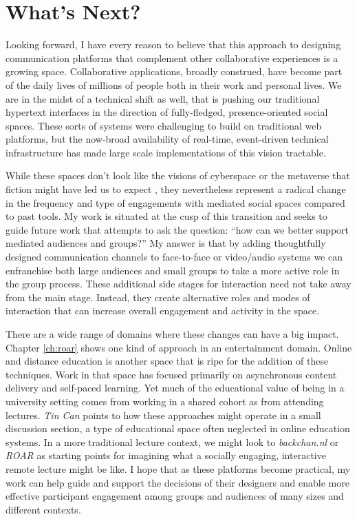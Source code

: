 

\section{What's Next?}
Looking forward, I have every reason to believe that this approach to designing communication platforms that complement other collaborative experiences is a growing space. Collaborative applications, broadly construed, have become part of the daily lives of millions of people both in their work and personal lives. We are in the midst of a technical shift as well, that is pushing our traditional hypertext interfaces in the direction of fully-fledged, presence-oriented social spaces. These sorts of systems were challenging to build on traditional web platforms, but the now-broad availability of real-time, event-driven technical infrastructure has made large scale implementations of this vision tractable.

While these spaces don't look like the visions of cyberspace or the metaverse that fiction might have led us to expect \citep{Stephenson:2000tv,Gibson:1986un,Vinge:2007wt}, they nevertheless represent a radical change in the frequency and type of engagements with mediated social spaces compared to past tools. My work is situated at the cusp of this transition and seeks to guide future work that attempts to ask the question: ``how can we better support mediated audiences and groups?'' My answer is that by adding thoughtfully designed communication channels to face-to-face or video/audio systems we can enfranchise both large audiences and small groups to take a more active role in the group process. These additional side stages for interaction need not take away from the main stage. Instead, they create alternative roles and modes of interaction that can increase overall engagement and activity in the space.

There are a wide range of domains where these changes can have a big impact. Chapter \ref{ch:roar} shows one kind of approach in an entertainment domain. Online and distance education is another space that is ripe for the addition of these techniques. Work in that space has focused primarily on asynchronous content delivery and self-paced learning. Yet much of the educational value of being in a university setting comes from working in a shared cohort as from attending lectures. \emph{Tin Can} points to how these approaches might operate in a small discussion section, a type of educational space often neglected in online education systems. In a more traditional lecture context, we might look to \emph{backchan.nl} or \emph{ROAR} as starting points for imagining what a socially engaging, interactive remote lecture might be like. I hope that as these platforms become practical, my work can help guide and support the decisions of their designers and enable more effective participant engagement among groups and audiences of many sizes and different contexts.



